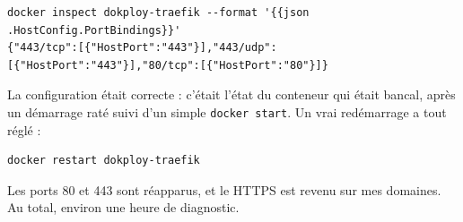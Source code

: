 \documentclass[10pt,twoside,openany]{article}
\begin{document}
\begin{lstlisting}
docker inspect dokploy-traefik --format '{{json .HostConfig.PortBindings}}'
{"443/tcp":[{"HostPort":"443"}],"443/udp":[{"HostPort":"443"}],"80/tcp":[{"HostPort":"80"}]}
\end{lstlisting}

La configuration était correcte : c'était l'état du conteneur qui était bancal, après un démarrage raté suivi d'un simple \texttt{docker start}. Un vrai redémarrage a tout réglé :

\begin{lstlisting}
docker restart dokploy-traefik
\end{lstlisting}

Les ports 80 et 443 sont réapparus, et le HTTPS est revenu sur mes domaines. Au total, environ une heure de diagnostic.
\end{document}
